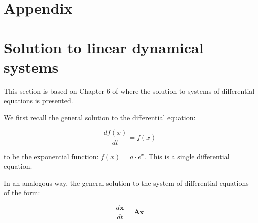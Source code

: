 \documentclass[10pt,twocolumn]{article}
\begin{document}
%
%
%
%
%
%
%
%
%
%
%
%
%

\newpage

\section*{Appendix}

\appendix

\section{Solution to linear dynamical systems} \label{app:A}

This section is based on Chapter 6 of \cite{Prof_Gilbert_Strang} where the solution to systems of differential equations is presented.

We first recall the general solution to the differential equation:

\begin{equation} \label{eq:DE_exp}
\frac{d f(x)}{dt} = f(x)
\end{equation}

to be the exponential function: $f(x) = a \cdot e^{x}$. This is a single differential equation.


In an analogous way, the general solution to the system of differential equations of the form:

\begin{equation} \label{eq:system_linear_A}
\frac{d \mathbf{x}}{dt} = \mathbf{A} \mathbf{x}
\end{equation}
\end{document}

